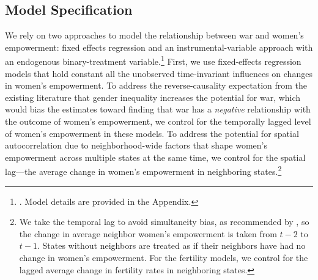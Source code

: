 \documentclass [12pt] {article}
\begin{document}
\subsection*{Model Specification}
\vspace*{.2in}

We rely on two approaches to model the relationship between war and women's empowerment: fixed effects regression and an instrumental-variable approach with an endogenous binary-treatment variable.\footnote{. Model details are provided in the Appendix.} First, we use fixed-effects regression models that hold constant all the unobserved time-invariant influences on changes in women's empowerment. To address the reverse-causality expectation from the existing literature that gender inequality increases the potential for war, which would bias the estimates toward finding that war has a  \emph{negative} relationship with the outcome of women's empowerment, we control for the temporally lagged level of women's empowerment in these models. To address the potential for spatial autocorrelation due to neighborhood-wide factors that shape women's empowerment across multiple states at the same time, we control for the spatial lag---the average change in women's empowerment in neighboring states.\footnote{We take the temporal lag to avoid simultaneity bias, as recommended by , so the change in average neighbor women's empowerment is taken from $t-2$ to $t-1$. States without neighbors are treated as if their neighbors have had no change in women's empowerment. For the fertility models, we control for the lagged average change in fertility rates in neighboring states.}\\
\end{document}
